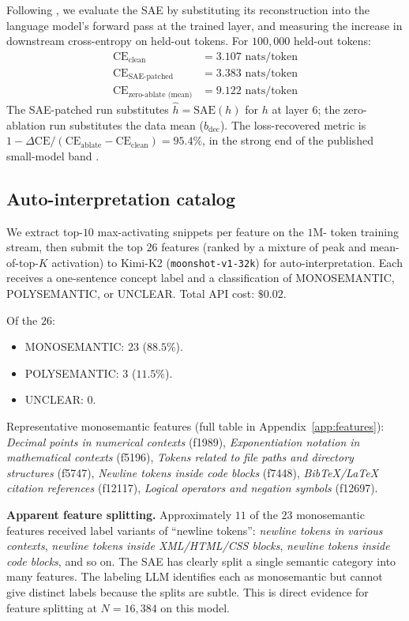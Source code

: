 \documentclass[11pt]{article}
\begin{document}
Following \cite{lieberum2024gemma}, we evaluate the SAE by substituting
its reconstruction into the language model's forward pass at the trained
layer, and measuring the increase in downstream cross-entropy on
held-out tokens. For $100{,}000$ held-out tokens:
\begin{align}
\text{CE}_{\text{clean}} &= 3.107 \text{ nats/token} \\
\text{CE}_{\text{SAE-patched}} &= 3.383 \text{ nats/token} \\
\text{CE}_{\text{zero-ablate (mean)}} &= 9.122 \text{ nats/token}
\end{align}
The SAE-patched run substitutes $\hat{h} = \text{SAE}(h)$ for $h$ at layer
$6$; the zero-ablation run substitutes the data mean
($b_{\text{dec}}$). The loss-recovered metric is
$1 - \Delta\text{CE} / (\text{CE}_{\text{ablate}} - \text{CE}_{\text{clean}})
= 95.4\%$, in the strong end of the published small-model band
\cite{bricken2023monosemanticity, lieberum2024gemma}.

\subsection{Auto-interpretation catalog}
\label{sec:autointerp}

We extract top-$10$ max-activating snippets per feature on the $1\text{M}$-
token training stream, then submit the top $26$ features (ranked by a
mixture of peak and mean-of-top-$K$ activation) to Kimi-K2
(\texttt{moonshot-v1-32k}) for auto-interpretation. Each receives a
one-sentence concept label and a classification of MONOSEMANTIC,
POLYSEMANTIC, or UNCLEAR. Total API cost: $\$0.02$.

Of the $26$:
\begin{itemize}
\item MONOSEMANTIC: $23$ ($88.5\%$).
\item POLYSEMANTIC: $3$ ($11.5\%$).
\item UNCLEAR: $0$.
\end{itemize}

Representative monosemantic features (full table in
Appendix~\ref{app:features}): \emph{Decimal points in numerical contexts}
(f1989), \emph{Exponentiation notation in mathematical contexts} (f5196),
\emph{Tokens related to file paths and directory structures} (f5747),
\emph{Newline tokens inside code blocks} (f7448),
\emph{BibTeX/LaTeX citation references} (f12117),
\emph{Logical operators and negation symbols} (f12697).

\textbf{Apparent feature splitting.} Approximately $11$ of the $23$
monosemantic features received label variants of ``newline tokens'':
\emph{newline tokens in various contexts}, \emph{newline tokens inside
XML/HTML/CSS blocks}, \emph{newline tokens inside code blocks}, and so on.
The SAE has clearly split a single semantic category into many features.
The labeling LLM identifies each as monosemantic but cannot give distinct
labels because the splits are subtle. This is direct evidence for
feature splitting at $N = 16{,}384$ on this model.
\end{document}

